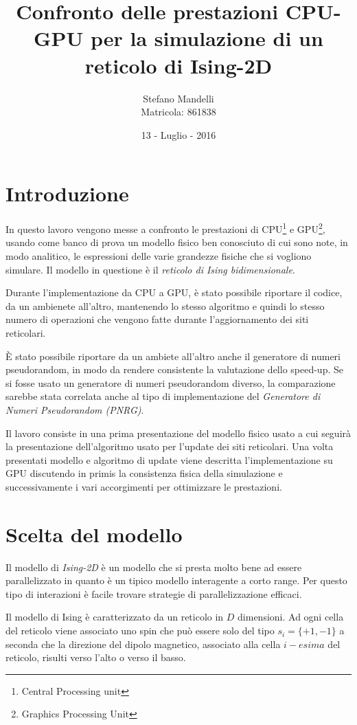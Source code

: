 \documentclass[a4paper,12pt]{article}
\begin{document}
\author{Stefano Mandelli\\
Matricola: 861838}
\title{\bf \Huge Confronto delle prestazioni CPU-GPU per la simulazione di un reticolo di Ising-2D}
\date{13 - Luglio - 2016}
\maketitle
\section*{Introduzione}
In questo lavoro vengono messe a confronto le prestazioni di CPU\footnote{Central Processing unit} e GPU\footnote{Graphics Processing Unit}, usando come banco di prova un modello fisico ben conosciuto di cui sono note, in modo analitico, le espressioni delle varie grandezze fisiche che si vogliono simulare. Il modello in questione \`e il \emph{reticolo di Ising bidimensionale}. 

Durante l'implementazione da CPU a GPU, \`e stato possibile riportare il codice, da un ambienete all'altro, mantenendo lo stesso algoritmo e quindi lo stesso numero di operazioni che vengono fatte durante l'aggiornamento dei siti reticolari.

\`E stato possibile riportare da un ambiete all'altro anche il generatore di numeri pseudorandom, in modo da rendere consistente la valutazione dello speed-up. Se si fosse usato un generatore di numeri pseudorandom diverso, la comparazione sarebbe stata correlata anche al tipo di implementazione del \emph{Generatore di Numeri Pseudorandom (PNRG)}. 

Il lavoro consiste in una prima presentazione del modello fisico usato a cui seguir\`a la presentazione dell'algoritmo usato per l'update dei siti reticolari. Una volta presentati modello e algoritmo di update viene descritta l'implementazione su GPU discutendo in primis la consistenza fisica della simulazione e successivamente i vari accorgimenti per ottimizzare le prestazioni.


\section{Scelta del modello}
Il modello di \emph{Ising-2D} è un modello che si presta molto bene ad essere parallelizzato in quanto è un tipico modello interagente a corto range. Per questo tipo di interazioni \`e facile trovare strategie di parallelizzazione efficaci.

Il modello di Ising è caratterizzato da un reticolo in $D$ dimensioni. Ad ogni cella del reticolo viene associato uno spin che può essere solo del tipo $s_i=\lbrace +1, -1 \rbrace$ a seconda che la direzione del dipolo magnetico, associato alla cella $i-esima$ del reticolo, risulti verso l'alto o verso il basso. 
\end{document}
